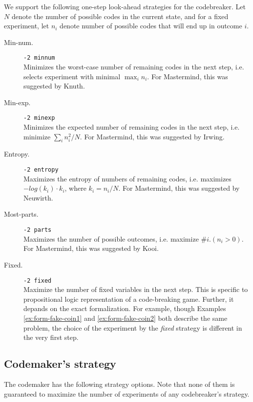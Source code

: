 We support the following one-step look-ahead strategies for the codebreaker.
Let $N$ denote the number of possible codes in the current state,
and for a fixed experiment, let $n_i$ denote number of possible codes that
will end up in outcome $i$.

\begin{description}
\item[Min-num.] \texttt{-2 minnum} \\
  Minimizes the worst-case number of remaining codes
  in the next step, i.e. selects experiment with minimal $\max_i n_i$.
  For Mastermind, this was suggested by Knuth\cite{mm-knuth}.
\item[Min-exp.]  \texttt{-2 minexp} \\
   Minimizes the expected number of remaining codes
  in the next step, i.e. minimize $\sum_in_i^2/N$.
  For Mastermind, this was suggested by Irwing\cite{mm-expnum}.
\item[Entropy.] \texttt{-2 entropy} \\
  Maximizes the entropy of numbers of remaining codes,
  i.e. maximizes $-log(k_i)\cdot k_i$, where $k_i=n_i/N$.
  For Mastermind, this was suggested by Neuwirth\cite{mm-entropy}.
\item[Most-parts.] \texttt{-2 parts} \\
  Maximizes the number of possible outcomes,
  i.e. maximize $\# i. (n_i > 0)$.
  For Mastermind, this was suggested by Kooi\cite{mm-mostparts}.
\item[Fixed.] \texttt{-2 fixed} \\
  Maximize the number of fixed variables
  in the next step.
  This is specific to propositional logic representation of a code-breaking game.
  Further, it depands on the exact formalization.
  For example, though Examples \ref{ex:form-fake-coin1}
  and \ref{ex:form-fake-coin2} both describe the same problem,
  the choice of the experiment by the \emph{fixed} strategy is
  different in the very first step.
\end{description}

\subsection{Codemaker's strategy}

The codemaker has the following strategy options.
Note that none of them is guaranteed to maximize the
  number of experiments of any codebreaker's strategy.

